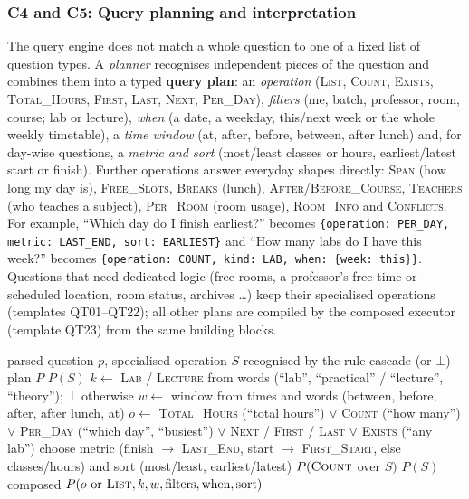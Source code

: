 \subsubsection{C4 and C5: Query planning and interpretation}
The query engine does not match a whole question to one of a fixed list of question types. A
\emph{planner} recognises independent pieces of the question and combines them into a typed
\textbf{query plan}: an \emph{operation} (\textsc{List}, \textsc{Count}, \textsc{Exists},
\textsc{Total\_Hours}, \textsc{First}, \textsc{Last}, \textsc{Next}, \textsc{Per\_Day}), \emph{filters}
(me, batch, professor, room, course; lab or lecture), \emph{when} (a date, a weekday, this/next week
or the whole weekly timetable), a \emph{time window} (at, after, before, between, after lunch) and,
for day-wise questions, a \emph{metric and sort} (most/least classes or hours, earliest/latest start
or finish). Further operations answer everyday shapes directly: \textsc{Span} (how long my day is),
\textsc{Free\_Slots}, \textsc{Breaks} (lunch), \textsc{After/Before\_Course}, \textsc{Teachers} (who teaches
a subject), \textsc{Per\_Room} (room usage), \textsc{Room\_Info} and \textsc{Conflicts}. For example, ``Which day do I finish earliest?'' becomes
\texttt{\{operation: PER\_DAY, metric: LAST\_END, sort: EARLIEST\}} and ``How many labs do I have
this week?'' becomes \texttt{\{operation: COUNT, kind: LAB, when: \{week: this\}\}}.
Questions that need dedicated logic (free rooms, a professor's free time or scheduled location,
room status, archives \ldots) keep their specialised operations (templates QT01--QT22); all other
plans are compiled by the composed executor (template QT23) from the same building blocks.

\begin{algorithm}[H]
\caption{Build a query plan from the parsed question}\label{alg:plan}
\begin{algorithmic}[1]
\Require parsed question $p$, specialised operation $S$ recognised by the rule cascade (or $\bot$)
\Ensure plan $P$
 \Return $P(S)$ \EndIf
\State $k \gets$ \textsc{Lab} / \textsc{Lecture} from words (``lab'', ``practical'' / ``lecture'', ``theory''); $\bot$ otherwise
\State $w \gets$ window from times and words (between, before, after, after lunch, at)
\State $o \gets$ \textsc{Total\_Hours} (``total hours'') $\vee$ \textsc{Count} (``how many'') $\vee$ \textsc{Per\_Day} (``which day'', ``busiest'') $\vee$ \textsc{Next} / \textsc{First} / \textsc{Last} $\vee$ \textsc{Exists} (``any lab'')
 choose metric (finish $\rightarrow$ \textsc{Last\_End}, start $\rightarrow$ \textsc{First\_Start}, else classes/hours) and sort (most/least, earliest/latest) \EndIf
{} \Return $P(\textsc{Count}$ over $S)$ \EndIf
{} \Return $P(S)$  \EndIf
\State \Return composed $P(o \text{ or } \textsc{List}, k, w, \text{filters}, \text{when}, \text{sort})$
\end{algorithmic}
\end{algorithm}

